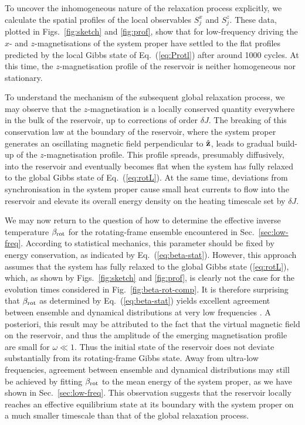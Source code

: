 \documentclass[aps,pre,twocolumn,notitlepage,floats,10pt]{revtex4-1}
\begin{document}
To uncover the inhomogeneous nature of the relaxation process explicitly, we
calculate the spatial profiles of the local observables $S_j^x$ and $S_j^z$.
These data, plotted in Figs.~\ref{fig:sketch} and \ref{fig:prof}, show that for
low-frequency driving the $x$- and $z$-magnetisations of the system proper have
settled to the flat profiles predicted by the local Gibbs state of
Eq.~(\ref{eq:Protl}) after around 1000 cycles.
At this time, the $z$-magnetisation profile of the reservoir is neither
homogeneous nor stationary.

To understand the mechanism of the subsequent global relaxation process, we may
observe that the $z$-magnetisation is a locally conserved quantity everywhere
in the bulk of the reservoir, up to corrections of order $\delta J$.
The breaking of this conservation law at the boundary of the reservoir, where
the system proper generates an oscillating magnetic field perpendicular to
$\hat{\bf z}$, leads to gradual build-up of the $z$-magnetisation profile.
This profile spreads, presumably diffusively, into the reservoir and eventually
becomes flat when the system has fully relaxed to the global Gibbs state of
Eq.~(\ref{eq:rotL}).
At the same time, deviations from synchronisation in the system proper cause
small heat currents to flow into the reservoir and elevate its overall energy
density on the heating timescale set by $\delta J$.

We may now return to the question of how to determine the effective inverse
temperature $\beta_{\rm rot}$ for the rotating-frame ensemble encountered in
Sec.~\ref{sec:low-freq}.
According to statistical mechanics, this parameter should be fixed by energy
conservation, as indicated by Eq.~(\ref{eq:beta-stat}).
However, this approach assumes that the system has fully relaxed to the global
Gibbs state (\ref{eq:rotL}), which, as shown by Figs.~\ref{fig:sketch} and
\ref{fig:prof}, is clearly not the case for the evolution times considered in
Fig.~\ref{fig:beta-rot-comp}.
It is therefore surprising that $\beta_{\rm rot}$ as determined by
Eq.~(\ref{eq:beta-stat}) yields excellent agreement between ensemble and
dynamical distributions at very low frequencies \cite{short-paper}.
A posteriori, this result may be attributed to the fact that the virtual
magnetic field on the reservoir, and thus the amplitude of the emerging
magnetisation profile are small for $\omega\ll 1$.
Thus the initial state of the reservoir does not deviate substantially from its
rotating-frame Gibbs state. Away from ultra-low frequencies, agreement between
ensemble and dynamical distributions may still be achieved by fitting
$\beta_{\rm rot}$ to the mean energy of the system proper, as we have shown in
Sec.~\ref{sec:low-freq}.
This observation suggests that the reservoir locally reaches an effective
equilibrium state at its boundary with the system proper on a much smaller
timescale than that of the global relaxation process.
\end{document}
